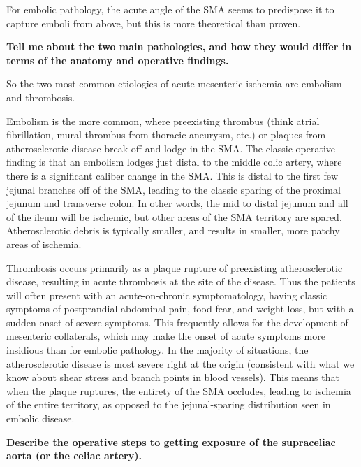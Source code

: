 \documentclass[
]{book}
\begin{document}
For embolic pathology, the acute angle of the SMA seems to predispose it
to capture emboli from above, but this is more theoretical than proven.

\textbf{Tell me about the two main pathologies, and how they would differ in
terms of the anatomy and operative findings.}

So the two most common etiologies of acute mesenteric ischemia are
embolism and thrombosis.~

Embolism is the more common, where preexisting thrombus (think atrial
fibrillation, mural thrombus from thoracic aneurysm, etc.) or plaques
from atherosclerotic disease break off and lodge in the SMA. The classic
operative finding is that an embolism lodges just distal to the middle
colic artery, where there is a significant caliber change in the SMA.
This is distal to the first few jejunal branches off of the SMA, leading
to the classic sparing of the proximal jejunum and transverse colon. In
other words, the mid to distal jejunum and all of the ileum will be
ischemic, but other areas of the SMA territory are spared.
Atherosclerotic debris is typically smaller, and results in smaller,
more patchy areas of ischemia.

Thrombosis occurs primarily as a plaque rupture of preexisting
atherosclerotic disease, resulting in acute thrombosis at the site of
the disease. Thus the patients will often present with an
acute-on-chronic symptomatology, having classic symptoms of postprandial
abdominal pain, food fear, and weight loss, but with a sudden onset of
severe symptoms. This frequently allows for the development of
mesenteric collaterals, which may make the onset of acute symptoms more
insidious than for embolic pathology. In the majority of situations, the
atherosclerotic disease is most severe right at the origin (consistent
with what we know about shear stress and branch points in blood
vessels). This means that when the plaque ruptures, the entirety of the
SMA occludes, leading to ischemia of the entire territory, as opposed to
the jejunal-sparing distribution seen in embolic disease.

\textbf{Describe the operative steps to getting exposure of the supraceliac
aorta (or the celiac artery).}
\end{document}
